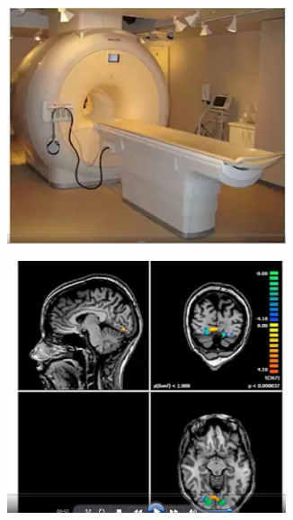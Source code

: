 \documentclass[]{article}
\begin{document}
\begin{figure}[H]
	\caption[Recording from the Brain]{Recording from the Brain. () \& () \gls{gls:fMRI}: resolution $1\;mm^3$; response is averaged over many neurons, and is slow. () \gls{gls:EEG}: response is averaged over many neurons; EEG is faster than fMRI, but noisy. () \& () Electrode Arrays: good if we have access to tissue directly\label{fig:recording} () \& () Calcium Imaging. Cells have markers that change the colour of fluorescence as calcium levels change in response to neural activity.} 
	\begin{subfigure}[t]{0.45\textwidth}
		\caption{}\label{fig:rb1}
		\includegraphics[width=0.9\textwidth]{fMRI}
	\end{subfigure}
	\begin{subfigure}[t]{0.45\textwidth}
		\caption{}\label{fig:rb2}
		\includegraphics[width=0.9\textwidth]{fMRI2}

\end{subfigure}
\end{figure}
\end{document}
